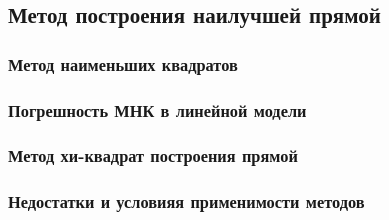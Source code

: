 \documentclass[12pt]{article}
\begin{document}
    \subsection{Метод построения наилучшей прямой}

      \subsubsection{Метод наименьших квадратов}

      \subsubsection{Погрешность МНК в линейной модели}

      \subsubsection{Метод хи-квадрат построения прямой}

      \subsubsection{Недостатки и условияя применимости методов}
\end{document}
